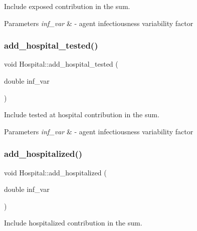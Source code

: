 Include exposed contribution in the sum. 


\begin{DoxyParams}{Parameters}
{\em inf\+\_\+var} & -\/ agent infectiousness variability factor \\
\hline
\end{DoxyParams}
\mbox{\label{classHospital_a501b5ff208e5cb612966f9200c6f359e}} 
\subsubsection{\texorpdfstring{add\+\_\+hospital\+\_\+tested()}{add\_hospital\_tested()}}
{\footnotesize\ttfamily void Hospital\+::add\+\_\+hospital\+\_\+tested (\begin{DoxyParamCaption}\item[{double}]{inf\+\_\+var }\end{DoxyParamCaption})\hspace{0.3cm}{\ttfamily [inline]}}



Include tested at hospital contribution in the sum. 


\begin{DoxyParams}{Parameters}
{\em inf\+\_\+var} & -\/ agent infectiousness variability factor \\
\hline
\end{DoxyParams}
\mbox{\label{classHospital_a568e499510d128da61f39f3983fa20a8}} 
\subsubsection{\texorpdfstring{add\+\_\+hospitalized()}{add\_hospitalized()}}
{\footnotesize\ttfamily void Hospital\+::add\+\_\+hospitalized (\begin{DoxyParamCaption}\item[{double}]{inf\+\_\+var }\end{DoxyParamCaption})\hspace{0.3cm}{\ttfamily [inline]}}



Include hospitalized contribution in the sum. 


